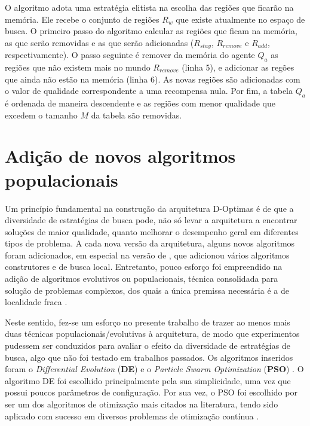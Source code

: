 O algoritmo adota uma estratégia elitista na escolha das regiões que ficarão na memória. Ele recebe o conjunto de regiões $R_w$ que existe atualmente no espaço de busca. O primeiro passo do algoritmo calcular as regiões que ficam na memória, as que serão removidas e as que serão adicionadas ($R_{stay}$, $R_{remove}$ e $R_{add}$, respectivamente). O passo seguinte é remover da memória do agente $Q_a$ as regiões que não existem mais no mundo $R_{remove}$ (linha 5), e adicionar as regões que ainda não estão na memória (linha 6). As novas regiões são adicionadas com o valor de qualidade correspondente a uma recompensa nula. Por fim, a tabela $Q_a$ é ordenada de maneira descendente e as regiões com menor qualidade que excedem o tamanho $M$ da tabela são removidas. 

\section{Adição de novos algoritmos populacionais}
\label{sec:algoritmos}

Um princípio fundamental na construção da arquitetura D-Optimas é de que a diversidade de estratégias de busca pode, não só levar a arquitetura a encontrar soluções de maior qualidade, quanto melhorar o desempenho geral em diferentes tipos de problema. A cada nova versão da arquitetura, alguns novos algoritmos foram adicionados, em especial na versão de , que adicionou vários algoritmos construtores e de busca local. Entretanto, pouco esforço foi empreendido na adição de algoritmos evolutivos ou populacionais, técnica consolidada para solução de problemas complexos, dos quais a única premissa necessária é a de localidade fraca \cite{gaspar2012}.

Neste sentido, fez-se um esforço no presente trabalho de trazer ao menos mais duas técnicas populacionais/evolutivas à arquitetura, de modo que experimentos pudessem ser conduzidos para avaliar o efeito da diversidade de estratégias de busca, algo que não foi testado em trabalhos passados. Os algoritmos inseridos foram o \textit{Differential Evolution} (\textbf{DE}) \cite{storn1997} e o \textit{Particle Swarm Optimization} (\textbf{PSO}) \cite{eberhart1995, eberhart1998}. O algoritmo DE foi escolhido principalmente pela sua simplicidade, uma vez que possui poucos parâmetros de configuração. Por sua vez, o PSO foi escolhido por ser um dos algoritmos de otimização mais citados na literatura, tendo sido aplicado com sucesso em diversos problemas de otimização contínua \cite{bonyadi2017}. 

